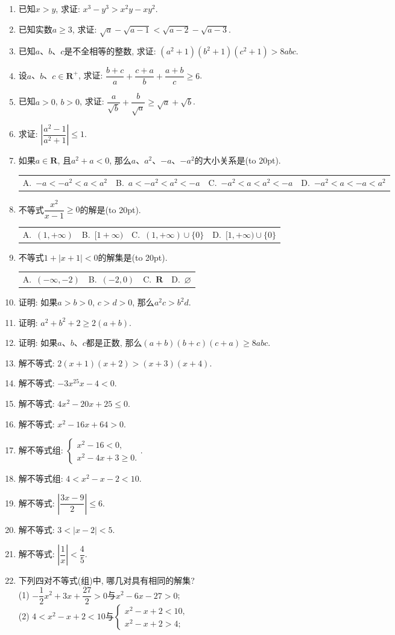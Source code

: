 \documentclass[10pt,a4paper]{article}
\newcommand{\bracket}[1]{(\hbox to #1pt{})}
\newcommand{\fourch}[4]{\par\begin{tabular}{p{.23\textwidth}p{.23\textwidth}p{.23\textwidth}p{.23\textwidth}}
A.~#1 &B.~#2& C.~#3& D.~#4
\end{tabular}}
\begin{document}
\begin{enumerate}[1.]
\item 已知$x>y$, 求证: $x^3-y^3>x^2y-xy^2$.
\item 已知实数$a\ge 3$, 求证: $\sqrt a-\sqrt {a-1}<\sqrt {a-2}-\sqrt {a-3}$.
\item 已知$a$、$b$、$c$是不全相等的整数, 求证: $(a^2+1)(b^2+1)(c^2+1)>8abc$.
\item 设$a$、$b$、$c\in \mathbf{R}^+$, 求证: $\dfrac{b+c}a+\dfrac{c+a}b+\dfrac{a+b}c\ge 6$.
\item 已知$a>0$, $b>0$, 求证: $\dfrac a{\sqrt b}+\dfrac b{\sqrt a}\ge \sqrt a+\sqrt b$.
\item 求证: $|\dfrac{a^2-1}{a^2+1}|\le 1$.
\item 如果$a\in \mathbf{R}$, 且$a^2+a<0$, 那么$a$、$a^2$、$-a$、$-a^2$的大小关系是\bracket{20}.
\fourch{$-a<-a^2<a<a^2$}{$a<-a^2<a^2<-a$}{$-a^2<a<a^2<-a$}{$-a^2<a<-a<a^2$}
\item 不等式$\dfrac{x^2}{x-1}\ge 0$的解是\bracket{20}.
\fourch{$(1,+\infty)$}{$[1+\infty)$}{$(1,+\infty)\cup \{0\}$}{$[1,+\infty)\cup \{0\}$}
\item 不等式$1+|x+1|<0$的解集是\bracket{20}.
\fourch{$(-\infty ,-2)$}{$(-2,0)$}{$\mathbf{R}$}{$\varnothing$}
\item 证明: 如果$a>b>0$, $c>d>0$, 那么$a^2c>b^2d$.
\item 证明: $a^2+b^2+2\ge 2(a+b)$.
\item 证明: 如果$a$、$b$、$c$都是正数, 那么$(a+b)(b+c)(c+a)\ge 8abc$.
\item 解不等式: $2(x+1)(x+2)>(x+3)(x+4)$.
\item 解不等式: $-3x^25x-4<0$.
\item 解不等式: $4x^2-20x+25\le 0$.
\item 解不等式: $x^2-16x+64>0$.
\item 解不等式组: $\begin{cases} x^2-16<0, \\ x^2-4x+3\ge 0. \end{cases}$.
\item 解不等式组: $4<x^2-x-2<10$.
\item 解不等式: $|\dfrac{3x-9}2|\le 6$.
\item 解不等式: $3<|x-2|<5$.
\item 解不等式: $|\dfrac 1x|<\dfrac 45$.
\item 下列四对不等式(组)中, 哪几对具有相同的解集?\\
(1) $-\dfrac 12x^2+3x+\dfrac{27}2>0$与$x^2-6x-27>0$;\\
(2) $4<x^2-x+2<10$与$\begin{cases} x^2-x+2<10, \\ x^2-x+2>4; \end{cases}$\\

\end{enumerate}
\end{document}
